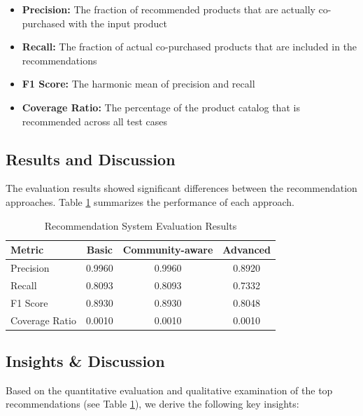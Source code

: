 \documentclass[conference]{IEEEtran}
\begin{document}
\begin{itemize}
    \item \textbf{Precision:} The fraction of recommended products that are actually co-purchased with the input product
    \item \textbf{Recall:} The fraction of actual co-purchased products that are included in the recommendations
    \item \textbf{F1 Score:} The harmonic mean of precision and recall
    \item \textbf{Coverage Ratio:} The percentage of the product catalog that is recommended across all test cases
\end{itemize}

\subsection{Results and Discussion}
The evaluation results showed significant differences between the recommendation approaches. Table \ref{tab:recommendation-results} summarizes the performance of each approach.

\begin{table}[ht]
\centering
\caption{Recommendation System Evaluation Results}
\label{tab:recommendation-results}
\begin{tabular}{lccc}
\toprule
\textbf{Metric} & \textbf{Basic} & \textbf{Community-aware} & \textbf{Advanced} \\
\midrule
Precision & 0.9960 & 0.9960 & 0.8920 \\
Recall & 0.8093 & 0.8093 & 0.7332 \\
F1 Score & 0.8930 & 0.8930 & 0.8048 \\
Coverage Ratio & 0.0010 & 0.0010 & 0.0010 \\
\bottomrule
\end{tabular}
\end{table}

\subsection{Insights \& Discussion}
Based on the quantitative evaluation and qualitative examination of the top recommendations (see Table \ref{tab:recommendation-results}), we derive the following key insights:
\end{document}
